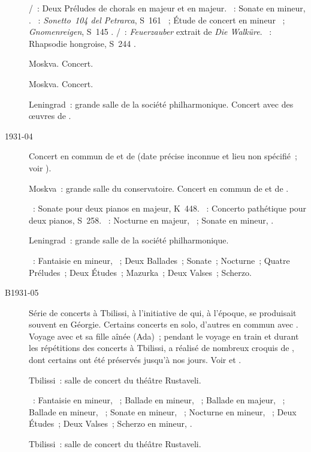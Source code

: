 \begin{description}
 \textsc{\JBach{}/\Busoni{}}~: Deux Préludes de chorals en \kC majeur et en
 \kG majeur.
 \textsc{\Beethoven{}}~: Sonate en \kC mineur, .
 \textsc{\Liszt{}}~: \emph{Sonetto~104 del Petrarca}, S~161 ~;
 Étude de concert en \kF mineur ~; \emph{Gnomenreigen}, S~145
 .
 \textsc{\Wagner{}/\Brassin{}}~: \emph{Feuerzauber} extrait de \emph{Die
 Walküre}.
 \textsc{\Liszt{}}~: Rhapsodie hongroise, S~244 .
 \item[\DateWithWeekDay{1931-04-14}]
 Moskva.
 Concert.
 \item[\DateWithWeekDay{1931-04-18}]
 Moskva.
 Concert.
 \item[\DateWithWeekDay{1931-04-21}]
 Leningrad~: grande salle de la société philharmonique.
 Concert avec des œuvres de \Chopin{}.
 \item[1931-04]
 Concert en commun de \VSofronitsky{} et de \MYudina{} (date précise
 inconnue et lieu non spécifié~; voir \citet[p.~403]{Scriabine}).
 \item[\DateWithWeekDay{1931-05-02}]
 Moskva~: grande salle du conservatoire.
 Concert en commun de \VSofronitsky{} et de \HNeuhaus{}.

 \textsc{\Mozart{}}~: Sonate pour deux pianos en \kD majeur, K~448.
 \textsc{\Liszt{}}~: Concerto pathétique pour deux pianos, S~258.
 \textsc{\Chopin{}}~: Nocturne en \kD \Flat majeur,  ~;
 Sonate en \kB \Flat mineur, .
 \item[\DateWithWeekDay{1931-05-03}]
 Leningrad~: grande salle de la société philharmonique.

 \textsc{\Chopin{}}~: Fantaisie en \kF mineur, ~; Deux Ballades~;
 Sonate~; Nocturne~; Quatre Préludes~; Deux Études~; Mazurka~; Deux Valses~;
 Scherzo.
 \item[B1931-05]
 Série de concerts à Tbilissi, à l'initiative de \MYudina{} qui, à l'époque,
 se produisait souvent en Géorgie.
 Certains concerts en solo, d'autres en commun avec \MYudina{}.
 Voyage avec \EVizel{} et sa fille aînée \AVizel{} (Ada)~; pendant le voyage
 en train et durant les répétitions des concerts à Tbilissi, \EVizel{} a
 réalisé de nombreux croquis  de \VSofronitsky{}, dont
 certains ont été préservés jusqu'à nos jours.
 Voir \citet[p.~152 et~153]{Nekrasova08} et \citet[p.~427]{Milshteyn82a}.
 \item[\DateWithWeekDay{1931-05-14}]
 Tbilissi~: salle de concert du théâtre Rustaveli.

 \textsc{\Chopin{}}~: Fantaisie en \kF mineur, ~; Ballade en \kF
 mineur, ~; Ballade en \kA \Flat majeur, ~; Ballade en \kG
 mineur, ~; Sonate en \kB \Flat mineur, ~; Nocturne en \kF
 mineur,  ~; Deux Études~; Deux Valses~; Scherzo en \kB
 mineur, .
 \item[\DateWithWeekDay{1931-05-16}]
 Tbilissi~: salle de concert du théâtre Rustaveli.


\end{description}
